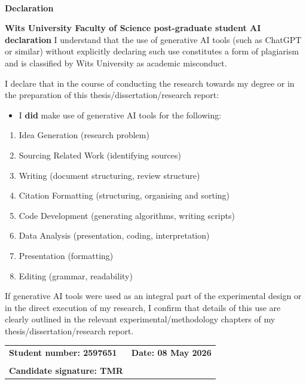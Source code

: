 \documentclass[a4paper,twoside,12pt]{report}
\newenvironment{declaration}{\ \vfill\begin{center}\textbf{Declaration}\end{center}\addcontentsline{toc}{section}{Declaration}}{\vfill\vfill\newpage}
\begin{document}
    \begin{declaration}
    \textbf{Wits University Faculty of Science post-graduate student AI declaration}
    \noindent I understand that the use of generative AI tools (such as ChatGPT or similar) without explicitly declaring such use constitutes a form of plagiarism and is classified by Wits University as academic misconduct.
    
    \vspace{12pt}
    
    \noindent I declare that in the course of conducting the research towards my degree or in the preparation of this thesis/dissertation/research report:
    
    \vspace{12pt}
    
    
    \begin{itemize}[label=$\square$]
        \item I \textbf{did} make use of generative AI tools for the following:
    \end{itemize}
    
    \begin{enumerate}[label=\arabic*.]
        \item Idea Generation (research problem)
        \item Sourcing Related Work (identifying sources)
        \item Writing (document structuring, review structure)
        \item Citation Formatting (structuring, organising and sorting)
        \item Code Development (generating algorithms, writing scripts)
        \item Data Analysis (presentation, coding, interpretation)
        \item Presentation (formatting)
        \item Editing (grammar, readability)
    \end{enumerate}
    
    \vspace{12pt}
    
    
    \vspace{12pt}
    
    
    \noindent If generative AI tools were used as an integral part of the experimental design or in the direct execution of my research, I confirm that details of this use are clearly outlined in the relevant experimental/methodology chapters of my thesis/dissertation/research report.
    
    \vspace{36pt}
    
    \begin{tabular}{p{}p{}}
        \textbf{Student number: 2597651} & \textbf{Date: 08 May 2026} \\
        \vspace{20pt} & \\
        \textbf{Candidate signature: TMR} & \\
    \end{tabular}
    \end{declaration}
    
\end{document}
